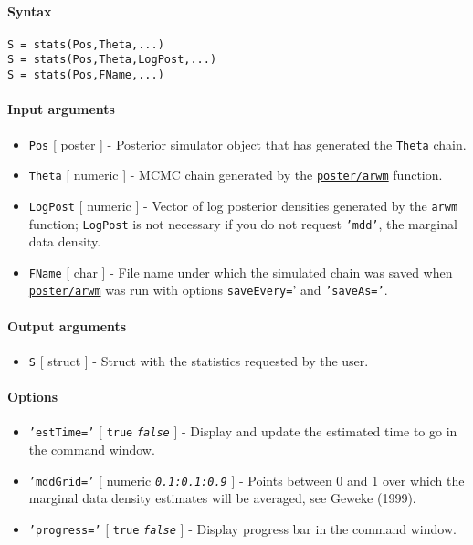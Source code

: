 


	\paragraph{Syntax}

\begin{verbatim}
S = stats(Pos,Theta,...)
S = stats(Pos,Theta,LogPost,...)
S = stats(Pos,FName,...)
\end{verbatim}

\paragraph{Input arguments}

\begin{itemize}
\item
  \texttt{Pos} {[} poster {]} - Posterior simulator object that has
  generated the \texttt{Theta} chain.
\item
  \texttt{Theta} {[} numeric {]} - MCMC chain generated by the
  \href{poster/arwm}{\texttt{poster/arwm}} function.
\item
  \texttt{LogPost} {[} numeric {]} - Vector of log posterior densities
  generated by the \texttt{arwm} function; \texttt{LogPost} is not
  necessary if you do not request \texttt{'mdd'}, the marginal data
  density.
\item
  \texttt{FName} {[} char {]} - File name under which the simulated
  chain was saved when \href{poster/arwm}{\texttt{poster/arwm}} was run
  with options \texttt{saveEvery=}' and \texttt{'saveAs='}.
\end{itemize}

\paragraph{Output arguments}

\begin{itemize}
\itemsep1pt\parskip0pt
\item
  \texttt{S} {[} struct {]} - Struct with the statistics requested by
  the user.
\end{itemize}

\paragraph{Options}

\begin{itemize}
\item
  \texttt{'estTime='} {[} \texttt{true} \textbar{} \emph{\texttt{false}}
  {]} - Display and update the estimated time to go in the command
  window.
\item
  \texttt{'mddGrid='} {[} numeric \textbar{} \emph{\texttt{0.1:0.1:0.9}}
  {]} - Points between 0 and 1 over which the marginal data density
  estimates will be averaged, see Geweke (1999).
\item
  \texttt{'progress='} {[} \texttt{true} \textbar{}
  \emph{\texttt{false}} {]} - Display progress bar in the command
  window.
\end{itemize}

